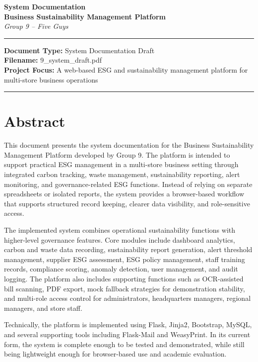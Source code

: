 \documentclass[10pt,a4paper]{article}
\begin{document}
\begin{center}
{\Large \textbf{System Documentation}}\\
\vspace{0.25em}
{\large \textbf{Business Sustainability Management Platform}}\\
\vspace{0.35em}
{\small\itshape Group 9 -- Five Guys}
\end{center}

\vspace{0.35em}
\hrule
\vspace{0.5em}
\small
\textbf{Document Type:} System Documentation Draft\\
\textbf{Filename:} 9\_system\_draft.pdf\\
\textbf{Project Focus:} A web-based ESG and sustainability management platform for multi-store business operations

\vspace{0.5em}
\hrule
\vspace{0.6em}
\normalsize

\section*{Abstract}
This document presents the system documentation for the Business Sustainability Management Platform developed by Group 9. The platform is intended to support practical ESG management in a multi-store business setting through integrated carbon tracking, waste management, sustainability reporting, alert monitoring, and governance-related ESG functions. Instead of relying on separate spreadsheets or isolated reports, the system provides a browser-based workflow that supports structured record keeping, clearer data visibility, and role-sensitive access.

The implemented system combines operational sustainability functions with higher-level governance features. Core modules include dashboard analytics, carbon and waste data recording, sustainability report generation, alert threshold management, supplier ESG assessment, ESG policy management, staff training records, compliance scoring, anomaly detection, user management, and audit logging. The platform also includes supporting functions such as OCR-assisted bill scanning, PDF export, mock fallback strategies for demonstration stability, and multi-role access control for administrators, headquarters managers, regional managers, and store staff.

Technically, the platform is implemented using Flask, Jinja2, Bootstrap, MySQL, and several supporting tools including Flask-Mail and WeasyPrint. In its current form, the system is complete enough to be tested and demonstrated, while still being lightweight enough for browser-based use and academic evaluation.
\end{document}
